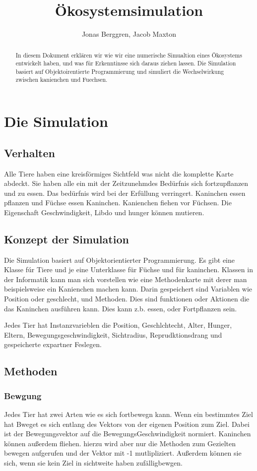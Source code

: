 \documentclass[12pt]{article}
\author{{\Large Jonas Berggren, Jacob Maxton}}
\title{{\myfont Ökosystemsimulation}}
\begin{document}
\maketitle
\tableofcontents
\newpage
\begin{abstract}
In diesem Dokument erklären wir wie wir eine numerische Simualtion eines Ökosystems entwickelt haben, und was für Erkenntinsse sich daraus ziehen lassen.
Die Simulation basiert auf Objektoirentierte Programmierung und simuliert die Wechselwirkung zwischen kanienchen und Fuechsen.
\end{abstract}

\section{Die Simulation}
\subsection{Verhalten}
Alle Tiere haben eine kreisförmiges Sichtfeld was nicht die komplette Karte abdeckt.
Sie haben alle ein mit der Zeitzunehmdes Bedürfnis sich fortzupflanzen und zu essen.
Das bedürfnis wird bei der Erfüllung verringert.
Kaninchen essen pflanzen und Füchse essen Kaninchen.
Kanienchen fiehen vor Füchsen.
Die Eigenschaft Geschwindigkeit, Libdo und hunger können mutieren.
\subsection{Konzept der Simulation}
Die Simulation basiert auf Objektorientierter Programmierung.
Es gibt eine Klasse fúr Tiere und je eine Unterklasse für Füchse und für kaninchen.
Klassen in der Informatik kann man sich vorstellen wie eine Methodenkarte mit derer man beispielsweise ein Kanienchen machen kann.
Darin gespeichert sind Variablen wie Position oder geschlecht, und Methoden.
Dies sind funktionen oder Aktionen die das Kaninchen ausführen kann.
Dies kann z.b. essen, oder Fortpflanzen sein.

Jedes Tier hat Instanzvarieblen die Position, Geschlchtecht, Alter, Hunger, Eltern, Bewegungsgeschwindigkeit, Sichtradius, Reprudktionsdrang und gespeicherte expartner Feslegen.
\subsection{Methoden}
\subsubsection{Bewgung}
Jedes Tier hat zwei Arten wie es sich fortbewegn kann.
Wenn ein bestimmtes Ziel hat Bweget es sich entlang des Vektors von der eigenen Position zum Ziel.
Dabei ist der Bewegungsvektor auf die BewegungsGeschwindigkeit normiert.
Kaninchen können außerdem fliehen.
hierzu wird aber nur die Methoden zum Gezielten bewegen aufgerufen und der Vektor mit -1 mutlipliziert.
Außerdem können sie sich, wenn sie kein Ziel in sichtweite haben zufälligbewgen.
\end{document}
